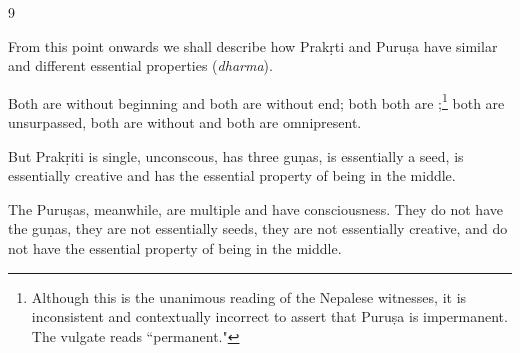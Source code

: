\begin{translation}

\item[9]

From this point onwards we shall describe how Prakṛti and Puruṣa have
similar and different essential properties 
(\emph{dharma}).

Both are without beginning and both are without end; both both are
;\footnote{Although this is the unanimous reading of
    the Nepalese witnesses, it is inconsistent and contextually incorrect
    to assert that Puruṣa is impermanent.  The vulgate reads
    ``permanent."} both are unsurpassed, both are without 
     and both are omnipresent.
 
But Prakṛiti is single, unconscous, has three guṇas, is essentially a
seed, is essentially creative and has the essential 
property of being in the middle.  

The Puruṣas, meanwhile, are multiple and have consciousness.  They do
not have the guṇas, they are not essentially seeds, they are not
essentially creative, and do not have the essential property of being in the 
middle.

\end{translation}
